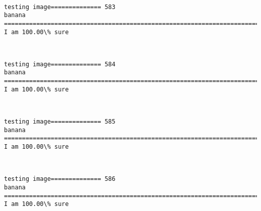 \documentclass[11pt]{article}
\begin{document}
    \begin{center}
    \end{center}
    { \hspace*{\fill} \\}
    
    \begin{Verbatim}[commandchars=\\\{\}]
testing image============== 583
banana
============================================================================
I am 100.00\% sure

    \end{Verbatim}

    \begin{center}
    \end{center}
    { \hspace*{\fill} \\}
    
    \begin{Verbatim}[commandchars=\\\{\}]
testing image============== 584
banana
============================================================================
I am 100.00\% sure

    \end{Verbatim}

    \begin{center}
    \end{center}
    { \hspace*{\fill} \\}
    
    \begin{Verbatim}[commandchars=\\\{\}]
testing image============== 585
banana
============================================================================
I am 100.00\% sure

    \end{Verbatim}

    \begin{center}
    \end{center}
    { \hspace*{\fill} \\}
    
    \begin{Verbatim}[commandchars=\\\{\}]
testing image============== 586
banana
============================================================================
I am 100.00\% sure

    \end{Verbatim}
\end{document}
